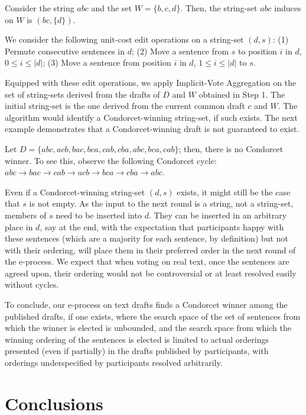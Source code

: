 \documentclass{llncs}
\begin{document}
\begin{example}
%
Consider the string $abc$ and the set $W = \{b, c, d\}$.
Then, the string-set $abc$ induces on $W$ is  $(bc,\{d\})$.
%
\end{example}

We consider the following unit-cost edit operations on a string-set $(d,s)$:
(1) Permute consecutive sentences in $d$;
(2) Move a sentence from $s$ to position $i$ in $d$, $0 \le i \le |d|$;
(3) Move a sentence from position $i$ in $d$, $1 \le i \le |d|$ to $s$.

Equipped with these edit operations,
we apply Implicit-Vote Aggregation on the set of string-sets derived from the drafts of $D$ and $W$ obtained in Step 1.  The initial string-set is the one derived from the current common draft $c$ and $W$.  The algorithm would identify a Condorcet-winning string-set, if such exists.
%
The next example demonstrates that a Condorcet-winning draft is not guaranteed to exist.

\begin{example}
%
Let $D = \{abc, acb, bac, bca, cab, cba, abc, bca, cab\}$; then, there is no Condorcet winner. To see this, observe the following Condorcet cycle: $abc \to bac \to cab \to acb \to bca \to cba \to abc$.
%
\end{example}

Even if a Condorcet-winning string-set $(d,s)$ exists, it might still be the case that $s$ is not empty.  As the input to the next round is a string, not a string-set, members of $s$ need to be inserted into $d$.  They can be inserted in an arbitrary place in $d$, say at the end, with the expectation that participants happy with these sentences (which are  a majority for each sentence, by definition) but not with their ordering, will place them in their preferred order in the next round of the e-process. We expect that when voting on real text, once the sentences are agreed upon, their ordering would not be controversial or at least resolved easily without cycles.  

To conclude, our e-process on text drafts finds a Condorcet winner among the published drafts, if one exists, where the search space of the set of sentences from which the winner is elected is unbounded, and the search space from which the winning ordering of the sentences is elected is limited to actual orderings presented (even if partially) in the drafts published by participants, with orderings underspecified by participants resolved arbitrarily.


\section{Conclusions}
\label{section:conclusions}
\end{document}
